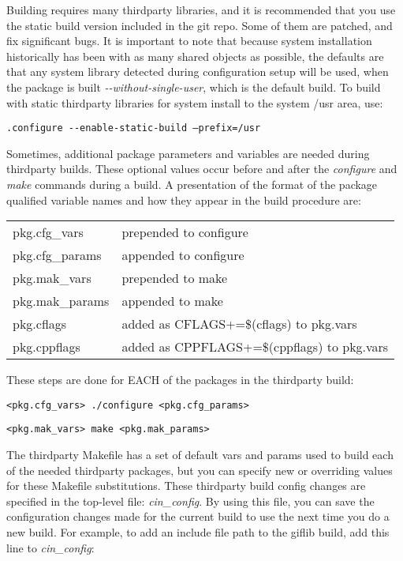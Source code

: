 Building \CGG{} requires many thirdparty libraries, and it is recommended that you use the static build version included in the git repo. Some of them are patched, and fix significant bugs. It is important to note that because system installation historically has been with as many shared objects as possible, the defaults are that any system library detected during configuration setup will be used, when the package is built \textit{-{}-without-single-user}, which is the default build. To build with static thirdparty libraries for system install to the system /usr area, use:

\hspace{2em}\texttt{.configure -{}-enable-static-build --prefix=/usr}

Sometimes, additional package parameters and variables are needed during thirdparty builds. These optional values occur before and after the \textit{configure} and \textit{make} commands during a build. A presentation of the format of the package qualified variable names and how they appear in the build procedure are:

\hspace{2em}
\begin{tabular}{@{}ll}
	pkg.cfg\_vars & prepended to configure\\
	pkg.cfg\_params & appended to configure\\
	pkg.mak\_vars & prepended to make\\
	pkg.mak\_params & appended to make\\
    pkg.cflags & added as CFLAGS+=\$(cflags) to pkg.vars\\
	pkg.cppflags & added as CPPFLAGS+=\$(cppflags) to pkg.vars\\
\end{tabular}

These steps are done for EACH of the packages in the thirdparty build:

\hspace{2em}\texttt{<pkg.cfg\_vars> ./configure <pkg.cfg\_params>}

\hspace{2em}\texttt{<pkg.mak\_vars> make <pkg.mak\_params>}

The thirdparty Makefile has a set of default vars and params used to build each of the needed thirdparty packages, but you can specify new or overriding values for these Makefile substitutions. These thirdparty build config changes are specified in the top-level file: \textit{cin\_config}. By using this file, you can save the configuration changes made for the current build to use the next time you do a new build. For example, to add an include file path to the giflib build, add this line to \textit{cin\_config}:

